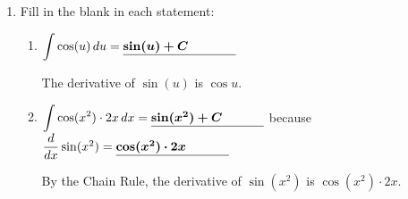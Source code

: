 \documentclass[main]{subfiles}
\begin{document}
\begin{enumerate}
\begin{enumerate}
      \begin{problem}[\vfill]
        $\displaystyle \int \cos(x^2)\,dx$
      \end{problem}

      \begin{solution}
        There is no way to write down this indefinite integral!  It turns
        out that $\cos(x^2)$ is an example of a function whose
        antiderivatives cannot be expressed as a finite sum of familiar
        functions (like exponentials, logs, trig functions, etc.).  This
        doesn't mean that $\cos(x^2)$ doesn't have antiderivatives (FTOC 1
        guarantees that it does!), but we can't write down any sort of
        nice formula for those antiderivatives.
      \end{solution}

    \end{enumerate}    
  \probonly{}

  \pspace{\newpage}

\item 

  Fill in the blank in each statement:

  \begin{enumerate}
  \item
    \begin{problem}
      $\displaystyle \int \cos(u)\, du = \fitb{1.25in}{\sin(u) + C}$
    \end{problem}

    \begin{solution}
      The derivative of $\sin(u)$ is $\cos u$.
    \end{solution}

  \item
    \begin{problem}
      $\displaystyle \int \cos(x^2) \cdot 2x\, dx =
      \fitb{1.25in}{\sin(x^2) + C}$ because $\dfrac{d}{dx} \sin(x^2) = 
      \fitb{1.25in}{\cos(x^2) \cdot 2x}$
    \end{problem}

    \begin{solution}
      By the Chain Rule, the derivative of $\sin(x^2)$ is $\cos(x^2) \cdot
      2x$.
    \end{solution}


\end{enumerate}
\end{enumerate}
\end{document}
